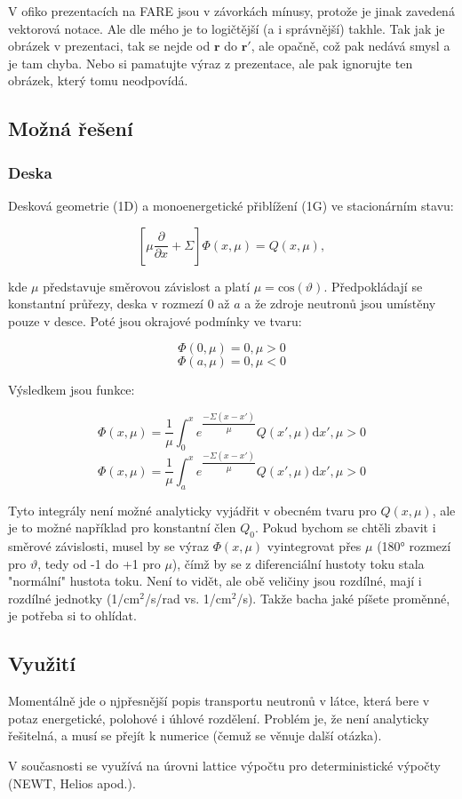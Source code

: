 V ofiko prezentacích na FARE jsou v závorkách mínusy, protože je jinak zavedená vektorová notace. Ale dle mého je to logičtější (a i správnější) takhle. Tak jak je obrázek v prezentaci, tak se nejde od $\textbf{r}$ do $\textbf{r}'$, ale opačně, což pak nedává smysl a je tam chyba. Nebo si pamatujte výraz z prezentace, ale pak ignorujte ten obrázek, který tomu neodpovídá.

\subsection{Možná řešení}

\subsubsection{Deska}

Desková geometrie (1D) a monoenergetické přiblížení (1G) ve stacionárním stavu:

$$\left [ \mu \dfrac{\partial}{\partial x} + \Sigma \right ] \Phi(x, \mu) = Q(x, \mu),$$

\noindent kde $\mu$ představuje směrovou závislost a platí $\mu = \text{cos}(\vartheta)$. Předpokládají se konstantní průřezy, deska v rozmezí $0$ až $a$ a že zdroje neutronů jsou umístěny pouze v desce. Poté jsou okrajové podmínky ve tvaru:

$$\Phi(0, \mu) = 0, \mu > 0$$
$$\Phi(a, \mu) = 0, \mu < 0$$

Výsledkem jsou funkce:

$$\Phi(x, \mu) = \dfrac{1}{\mu} \int_0^x e^{\dfrac{-\Sigma (x-x')}{\mu}} Q(x', \mu) \text{d}x', \mu > 0$$
$$\Phi(x, \mu) = \dfrac{1}{\mu} \int_a^x e^{\dfrac{-\Sigma (x-x')}{\mu}} Q(x', \mu) \text{d}x', \mu > 0$$

Tyto integrály není možné analyticky vyjádřit v obecném tvaru pro $Q(x, \mu)$, ale je to možné například pro konstantní člen $Q_0$. Pokud bychom se chtěli zbavit i směrové závislosti, musel by se výraz $\Phi(x, \mu)$ vyintegrovat přes $\mu$ (180° rozmezí pro $\vartheta$, tedy od -1 do +1 pro $\mu$), čímž by se z diferenciální hustoty toku stala "normální" hustota toku. Není to vidět, ale obě veličiny jsou rozdílné, mají i rozdílné jednotky (1/cm$^2$/s/rad vs. 1/cm$^2$/s). Takže bacha jaké píšete proměnné, je potřeba si to ohlídat.

\subsection{Využití}

Momentálně jde o njpřesnější popis transportu neutronů v látce, která bere v potaz energetické, polohové i úhlové rozdělení. Problém je, že není analyticky řešitelná, a musí se přejít k numerice (čemuž se věnuje další otázka).

V současnosti se využívá na úrovni lattice výpočtu pro deterministické výpočty (NEWT, Helios apod.).